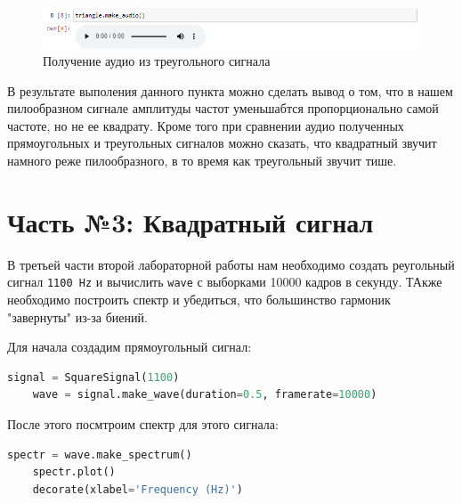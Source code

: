 \documentclass[a4paper]{article}
\begin{document}
            \begin{figure}[H]
                \centering
                \includegraphics[width=\textwidth]{ex_2_compare_triangle_audio.png}
                \caption{Получение аудио из треугольного сигнала}
                \label{fig:compare_triangle_audio}
            \end{figure}
            
            В результате выполения данного пункта можно сделать вывод о том, что в нашем пилообразном сигнале амплитуды частот уменьшабтся пропорционально самой частоте, но не ее квадрату. Кроме того при сравнении аудио полученных прямоугольных и треугольных сигналов можно сказать, что квадратный звучит намного реже пилообразного, в то время как треугольный звучит тише.
            
    \newpage
        \section{Часть №3: Квадратный сигнал}
            В третьей части второй лабораторной работы нам необходимо создать реугольный сигнал \texttt{1100 Hz} и вычислить \texttt{wave} с выборками 10000 кадров в секунду. ТАкже необходимо построить спектр и убедиться, что большинство гармоник "завернуты" из-за биений.
            
            Для начала создадим прямоугольный сигнал:
            
\begin{lstlisting}[language=Python, caption= Построение прямоугольного сигнала]
    signal = SquareSignal(1100)
    wave = signal.make_wave(duration=0.5, framerate=10000)
\end{lstlisting}       
            
            После этого посмтроим спектр для этого сигнала:
            
\begin{lstlisting}[language=Python, caption= Построение спектра]
    spectr = wave.make_spectrum()
    spectr.plot()
    decorate(xlabel='Frequency (Hz)')
\end{lstlisting}               
            
\end{document}
